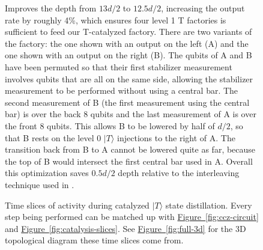 \documentclass[superscriptaddress,notitlepage,longbibliography]{revtex4-1}
\newcommand{\fig}[1]{\hyperref[fig:#1]{Figure~\ref*{fig:#1}}}
\begin{document}
\begin{figure}[ht]
{        Improves the depth from $13d/2$ to $12.5d/2$, increasing the output rate by roughly 4\%, which ensures four level 1 T factories is sufficient to feed our T-catalyzed factory.
        There are two variants of the factory: the one shown with an output on the left (A) and the one shown with an output on the right (B).
        The qubits of A and B have been permuted so that their first stabilizer measurement involves qubits that are all on the same side, allowing the stabilizer measurement to be performed without using a central bar.
        The second measurement of B (the first measurement using the central bar) is over the back 8 qubits and the last measurement of A is over the front 8 qubits.
        This allows B to be lowered by half of $d/2$, so that B rests on the level 0 $|T\rangle$ injections to the right of A.
        The transition back from B to A cannot be lowered quite as far, because the top of B would intersect the first central bar used in A.
        Overall this optimization saves $0.5d/2$ depth relative to the interleaving technique used in \cite{fowler2018}.
    }
\end{figure}

\begin{figure}[ht]
  \label{fig:full-slices}
  \caption{
    Time slices of activity during catalyzed $|T\rangle$ state distillation.
    Every step being performed can be matched up with \fig{ccz-circuit} and \fig{catalysis-slices}.
    See \fig{full-3d} for the 3D topological diagram these time slices come from.
  }
\end{figure}
\end{document}
